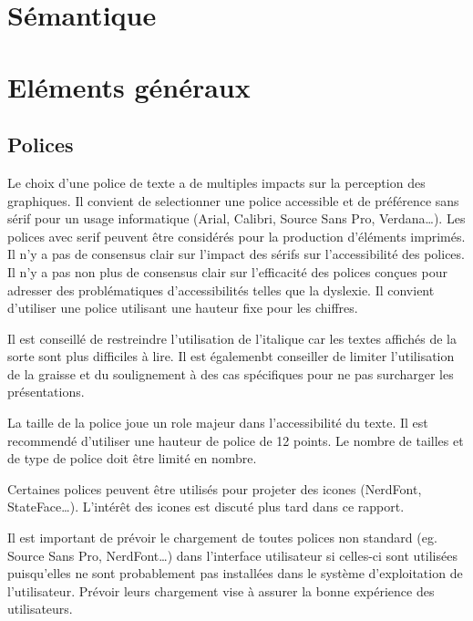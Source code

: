 \documentclass[a4paper,12pt]{article}
\begin{document}
\begin{multicols}{2}
\section*{Sémantique}
\label{sec:org10461f8}

\section*{Eléments généraux}
\label{sec:orgd59032a}
\subsection*{Polices}
\label{sec:orgc091065}
Le choix d'une police de texte a de multiples impacts sur la perception des graphiques. Il convient de selectionner une police accessible et de préférence sans sérif pour un usage informatique (Arial, Calibri, Source Sans Pro, Verdana\ldots{}). \autocite{andreaskrauseBestPracticesData2024} Les polices avec serif peuvent être considérés pour la production d'éléments imprimés. Il n'y a pas de consensus clair sur l'impact des sérifs sur l'accessibilité des polices. \autocite{stephenfewTableDesign2012} Il n'y a pas non plus de consensus clair sur l'efficacité des polices conçues pour adresser des problématiques d'accessibilités telles que la dyslexie. Il convient d'utiliser une police utilisant une hauteur fixe pour les chiffres. \autocite{stephenfewTableDesign2012}

Il est conseillé de restreindre l'utilisation de l'italique car les textes affichés de la sorte sont plus difficiles à lire. Il est égalemenbt conseiller de limiter l'utilisation de la graisse et du soulignement à des cas spécifiques pour ne pas surcharger les présentations.

La taille de la police joue un role majeur dans l'accessibilité du texte. Il est recommendé d'utiliser une hauteur de police de 12 points.\autocite{andreaskrauseBestPracticesData2024} Le nombre de tailles et de type de police doit être limité en nombre.\autocite{andreaskrauseBestPracticesData2024}

Certaines polices peuvent être utilisés pour projeter des icones (NerdFont, StateFace\ldots{}).\autocite{jonathanschwabishQualitative2021} L'intérêt des icones est discuté plus tard dans ce rapport.

Il est important de prévoir le chargement de toutes polices non standard (eg. Source Sans Pro, NerdFont\ldots{}) dans l'interface utilisateur si celles-ci sont utilisées puisqu'elles ne sont probablement pas installées dans le système d'exploitation de l'utilisateur. Prévoir leurs chargement vise à assurer la bonne expérience des utilisateurs.

\end{multicols}
\end{document}
